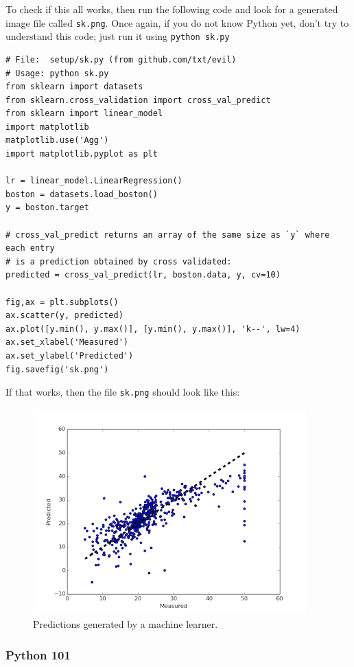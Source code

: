 To check if this all works, then run the following code and look for a
generated image file called \texttt{sk.png}. Once again, if you do not
know Python yet, don't try to understand this code; just run it using
\texttt{python\ sk.py}

\begin{lstlisting}
# File:  setup/sk.py (from github.com/txt/evil)
# Usage: python sk.py
from sklearn import datasets
from sklearn.cross_validation import cross_val_predict
from sklearn import linear_model
import matplotlib
matplotlib.use('Agg')
import matplotlib.pyplot as plt

lr = linear_model.LinearRegression()
boston = datasets.load_boston()
y = boston.target

# cross_val_predict returns an array of the same size as `y` where each entry
# is a prediction obtained by cross validated:
predicted = cross_val_predict(lr, boston.data, y, cv=10)

fig,ax = plt.subplots()
ax.scatter(y, predicted)
ax.plot([y.min(), y.max()], [y.min(), y.max()], 'k--', lw=4)
ax.set_xlabel('Measured')
ax.set_ylabel('Predicted')
fig.savefig('sk.png')
\end{lstlisting}

If that works, then the file \texttt{sk.png} should look like this:

\begin{figure}[htbp]
\centering
\includegraphics{img/sk.png}
\caption{Predictions generated by a machine learner.}
\end{figure}

\subsubsection{Python 101}\label{python-101}

